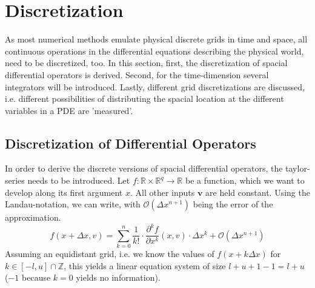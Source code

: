 \chapter{Discretization}\label{chapter:introduction}
As most numerical methods emulate physical discrete grids in time and space, all continuous operations in the differential equations describing the physical world, need to be discretized, too.
In this section, first, the discretization of spacial differential operators is derived.
Second, for the time-dimension several integrators will be introduced.
Lastly, different grid discretizations are discussed, i.e. different possibilities of distributing the spacial location at the different variables in a PDE are 'measured'.

\section{Discretization of Differential Operators}
In order to derive the discrete versions of spacial differential operators, the taylor-series needs to be introduced.
Let $f:\mathbb{R}\times\mathbb{R}^q\rightarrow \mathbb{R}$ be a function, which we want to develop along its first argument $x$.
All other inputs $\boldsymbol{v}$ are held constant.
Using the Landau-notation, we can write, with $\mathcal{O}(\Delta x ^{n+1})$ being the error of the approximation.
\begin{equation}
f(x+\Delta x,v) = \sum_{k=0}^{n}\frac{1}{k!}\cdot\frac{\partial^k f}{\partial x ^k}(x,v)\cdot \Delta x^k + \mathcal{O}(\Delta x ^{n+1})
\end{equation}
Assuming an equidistant grid, i.e. we know the values of $f(x+k\Delta x)$ for $k\in [-l,u] \cap \mathbb{Z}$, this yields a linear equation system of size $l + u + 1 - 1= l + u$ ($-1$ because $k=0$ yields no information).

